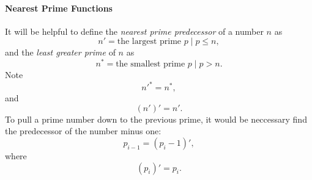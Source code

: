 \documentclass{article}
\begin{document}
\paragraph{Nearest Prime Functions}	It will be helpful to define the \emph{nearest prime predecessor} of a number $n$ as
	\begin{equation*}n' = \text{the largest prime } p \mid p \leq n,\end{equation*}
and the \emph{least greater prime} of $n$ as
	\begin{equation*}n^* = \text{the smallest prime } p  \mid p > n.\end{equation*}
Note
	\begin{equation*}n'^* = n^*,\end{equation*}
and
	\begin{equation*}(n')' = n'.\end{equation*}
To pull a prime number down to the previous prime, it would be neccessary find the predecessor of the number minus one:
	\begin{equation*} p_{i-1} = (p_i-1)',\end{equation*}
where
	\begin{equation*} (p_i)' = p_i.\end{equation*}
\end{document}
